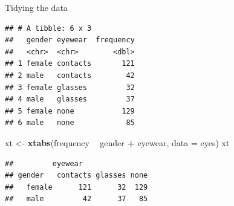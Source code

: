 \documentclass[ignorenonframetext,]{beamer}
\newenvironment{Shaded}{\begin{snugshade}}{\end{snugshade}}
\newcommand{\DataTypeTok}[1]{\textcolor[rgb]{0.13,0.29,0.53}{#1}}
\newcommand{\KeywordTok}[1]{\textcolor[rgb]{0.13,0.29,0.53}{\textbf{#1}}}
\newcommand{\NormalTok}[1]{#1}
\newcommand{\OperatorTok}[1]{\textcolor[rgb]{0.81,0.36,0.00}{\textbf{#1}}}
\newcommand{\StringTok}[1]{\textcolor[rgb]{0.31,0.60,0.02}{#1}}
\begin{document}
\begin{frame}[fragile]{Tidying the data}
\protect\hypertarget{tidying-the-data}{}

\begin{Shaded}
\end{Shaded}

\begin{verbatim}
## # A tibble: 6 x 3
##   gender eyewear  frequency
##   <chr>  <chr>        <dbl>
## 1 female contacts       121
## 2 male   contacts        42
## 3 female glasses         32
## 4 male   glasses         37
## 5 female none           129
## 6 male   none            85
\end{verbatim}

\begin{Shaded}
\begin{Highlighting}[]
\NormalTok{xt <-}\StringTok{ }\KeywordTok{xtabs}\NormalTok{(frequency }\OperatorTok{~}\StringTok{ }\NormalTok{gender }\OperatorTok{+}\StringTok{ }\NormalTok{eyewear, }\DataTypeTok{data =}\NormalTok{ eyes)}
\NormalTok{xt}
\end{Highlighting}
\end{Shaded}

\begin{verbatim}
##         eyewear
## gender   contacts glasses none
##   female      121      32  129
##   male         42      37   85
\end{verbatim}

\end{frame}
\end{document}
